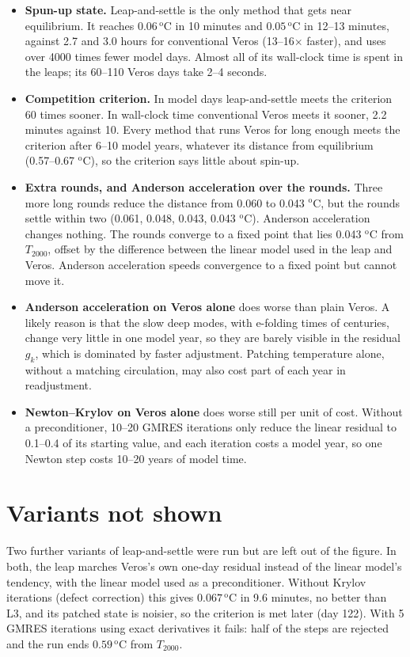 \documentclass{article}
\begin{document}
\begin{itemize}
\item \textbf{Spun-up state.} Leap-and-settle is the only method that gets near equilibrium. It reaches $0.06\,^{\text{o}}$C in 10 minutes and $0.05\,^{\text{o}}$C in 12--13 minutes, against 2.7 and 3.0 hours for conventional Veros (13--16$\times$ faster), and uses over 4000 times fewer model days. Almost all of its wall-clock time is spent in the leaps; its 60--110 Veros days take 2--4 seconds.
\item \textbf{Competition criterion.} In model days leap-and-settle meets the criterion 60 times sooner. In wall-clock time conventional Veros meets it sooner, 2.2 minutes against 10. Every method that runs Veros for long enough meets the criterion after 6--10 model years, whatever its distance from equilibrium (0.57--0.67 $^{\text{o}}$C), so the criterion says little about spin-up.
\item \textbf{Extra rounds, and Anderson acceleration over the rounds.} Three more long rounds reduce the distance from 0.060 to 0.043 $^{\text{o}}$C, but the rounds settle within two (0.061, 0.048, 0.043, 0.043 $^{\text{o}}$C). Anderson acceleration changes nothing. The rounds converge to a fixed point that lies 0.043 $^{\text{o}}$C from $T_{2000}$, offset by the difference between the linear model used in the leap and Veros. Anderson acceleration speeds convergence to a fixed point but cannot move it.
\item \textbf{Anderson acceleration on Veros alone} does worse than plain Veros. A likely reason is that the slow deep modes, with e-folding times of centuries, change very little in one model year, so they are barely visible in the residual $g_k$, which is dominated by faster adjustment. Patching temperature alone, without a matching circulation, may also cost part of each year in readjustment.
\item \textbf{Newton--Krylov on Veros alone} does worse still per unit of cost. Without a preconditioner, 10--20 GMRES iterations only reduce the linear residual to 0.1--0.4 of its starting value, and each iteration costs a model year, so one Newton step costs 10--20 years of model time.
\end{itemize}

\section*{Variants not shown}

Two further variants of leap-and-settle were run but are left out of the figure. In both, the leap marches Veros's own one-day residual instead of the linear model's tendency, with the linear model used as a preconditioner. Without Krylov iterations (defect correction) this gives $0.067\,^{\text{o}}$C in 9.6 minutes, no better than L3, and its patched state is noisier, so the criterion is met later (day 122). With 5 GMRES iterations using exact derivatives it fails: half of the steps are rejected and the run ends $0.59\,^{\text{o}}$C from $T_{2000}$.
\end{document}
